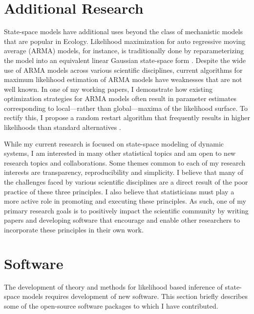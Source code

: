\documentclass{article}
\begin{document}
\section{Additional Research}

State-space models have additional uses beyond the class of mechanistic models that are popular in Ecology.
Likelihood maximization for auto regressive moving average (ARMA) models, for instance, is traditionally done by reparameterizing the model into an equivalent linear Gaussian state-space form \cite{gardner80, durbin12}.
Despite the wide use of ARMA models across various scientific disciplines, current algorithms for maximum likelihood estimation of ARMA models have weaknesses that are not well known.
In one of my working papers, I demonstrate how existing optimization strategies for ARMA models often result in parameter estimates corresponding to local---rather than global---maxima of the likelihood surface.
To rectify this, I propose a random restart algorithm that frequently results in higher likelihoods than standard alternatives \cite{wheelerARMA}.

While my current research is focused on state-space modeling of dynamic systems, I am interested in many other statistical topics and am open to new research topics and collaborations.
Some themes common to each of my research interests are transparency, reproducibility and simplicity.
I believe that many of the challenges faced by various scientific disciplines are a direct result of the poor practice of these three principles.
I also believe that statisticians must play a more active role in promoting and executing these principles.
As such, one of my primary research goals is to positively impact the scientific community by writing papers and developing software that encourage and enable other researchers to incorporate these principles in their own work.

\section{Software}\label{sec:software}

The development of theory and methods for likelihood based inference of state-space models requires development of new software.
This section briefly describes some of the open-source software packages to which I have contributed.
\end{document}
